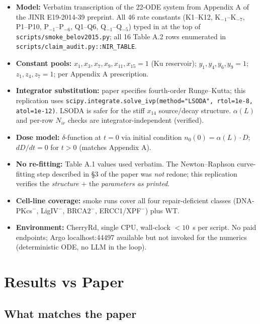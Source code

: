 \documentclass[11pt]{article}
\begin{document}
\begin{itemize}
  \item \textbf{Model:} Verbatim transcription of the 22-ODE system from Appendix A of
        the JINR E19-2014-39 preprint. All 46 rate constants (K1--K12, K$_{-1}$--K$_{-7}$,
        P1--P10, P$_{-1}$--P$_{-6}$, Q1--Q6, Q$_{-1}$--Q$_{-5}$) typed in at the top of
        \texttt{scripts/smoke\_belov2015.py}; all 16 Table A.2 rows enumerated in
        \texttt{scripts/claim\_audit.py::NIR\_TABLE}.
  \item \textbf{Constant pools:} $x_1,x_3,x_7,x_9,x_{11},x_{15}=1$ (Ku reservoir);
        $y_1,y_4,y_6,y_9=1$; $z_1,z_4,z_7=1$; per Appendix A prescription.
  \item \textbf{Integrator substitution:} paper specifies fourth-order Runge--Kutta;
        this replication uses \texttt{scipy.integrate.solve\_ivp(method="LSODA",
        rtol=1e-8, atol=1e-12)}. LSODA is safer for the stiff $x_{14}$ source/decay
        structure. $\alpha(L)$ and per-row $N_{ir}$ checks are integrator-independent
        (verified).
  \item \textbf{Dose model:} $\delta$-function at $t=0$ via initial condition
        $n_0(0)=\alpha(L)\cdot D$; $dD/dt=0$ for $t>0$ (matches Appendix A).
  \item \textbf{No re-fitting:} Table A.1 values used verbatim. The Newton--Raphson
        curve-fitting step described in \S3 of the paper was \emph{not} redone;
        this replication verifies the \emph{structure} + the \emph{parameters as printed}.
  \item \textbf{Cell-line coverage:} smoke runs cover all four repair-deficient
        classes (DNA-PKcs$^-$, LigIV$^-$, BRCA2$^-$, ERCC1/XPF$^-$) plus WT.
  \item \textbf{Environment:} CherryRd, single CPU, wall-clock $<10$~s per script.
        No paid endpoints; Argo localhost:44497 available but not invoked for the
        numerics (deterministic ODE, no LLM in the loop).
\end{itemize}

\section*{Results vs Paper}

\subsection*{What matches the paper}
\end{document}
